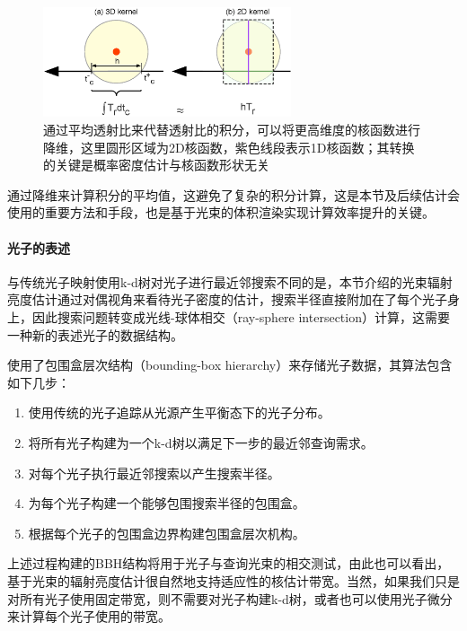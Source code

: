 \begin{figure}
	\sidecaption
	\includegraphics[width=0.65\textwidth]{figures/pm/averaging-transmittance}
	\caption{通过平均透射比来代替透射比的积分，可以将更高维度的核函数进行降维，这里圆形区域为2D核函数，紫色线段表示1D核函数；其转换的关键是概率密度估计与核函数形状无关}
	\label{f:pm-averaging-transmittance}
\end{figure}

通过降维来计算积分的平均值，这避免了复杂的积分计算，这是本节及后续估计会使用的重要方法和手段，也是基于光束的体积渲染实现计算效率提升的关键。





\paragraph{光子的表述}
与传统光子映射使用k-d树对光子进行最近邻搜索不同的是，本节介绍的光束辐射亮度估计通过对偶视角来看待光子密度的估计，搜索半径直接附加在了每个光子身上，因此搜索问题转变成光线-球体相交（ray-sphere intersection）计算，这需要一种新的表述光子的数据结构。

\cite{a:TheBeamRadianceEstimateforVolumetricPhotonMapping}使用了包围盒层次结构（bounding-box hierarchy）来存储光子数据，其算法包含如下几步：

\begin{enumerate}
	\item 使用传统的光子追踪从光源产生平衡态下的光子分布。
	\item 将所有光子构建为一个k-d树以满足下一步的最近邻查询需求。
	\item 对每个光子执行最近邻搜索以产生搜索半径。
	\item 为每个光子构建一个能够包围搜索半径的包围盒。
	\item 根据每个光子的包围盒边界构建包围盒层次机构。
\end{enumerate}

上述过程构建的BBH结构将用于光子与查询光束的相交测试，由此也可以看出，基于光束的辐射亮度估计很自然地支持适应性的核估计带宽。当然，如果我们只是对所有光子使用固定带宽，则不需要对光子构建k-d树，或者也可以使用光子微分来计算每个光子使用的带宽。

